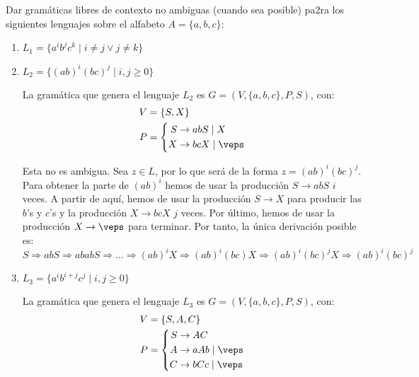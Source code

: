 \begin{ejercicio}\label{ej:1.4.7}
    Dar gramáticas libres de contexto no ambiguas (cuando sea posible) pa2ra los siguientes lenguajes sobre el alfabeto $A = \{ a, b, c \}$:
    \begin{enumerate}
        \item $L_1 = \{ a^i b^j c^k \mid i \neq j \lor j \neq k \}$

        \item $L_2 = \{ (ab)^i (bc)^j \mid i, j \geq 0 \}$
        
        La gramática que genera el lenguaje $L_2$ es $G=(V,\{a,b,c\},P,S)$, con:
        \begin{equation*}
            \begin{aligned}
                V &= \{ S, X \} \\
                P &= \left\{
                    \begin{aligned}
                        S &\rightarrow abS \mid X \\
                        X &\rightarrow bcX \mid \veps
                    \end{aligned}
                \right.
            \end{aligned}
        \end{equation*}

        Esta no es ambigua. Sea $z\in L$, por lo que será de la forma $z=(ab)^i(bc)^j$. Para obtener la parte de $(ab)^i$ hemos de usar la producción $S\rightarrow abS$ $i$ veces. A partir de aquí, hemos de usar la producción $S\rightarrow X$ para producir las $b$'s y $c$'s y la producción $X\rightarrow bcX$ $j$ veces. Por último, hemos de usar la producción $X\rightarrow \veps$ para terminar. Por tanto, la única derivación posible es:
        \begin{equation*}
            S\Rightarrow abS\Rightarrow ababS\Rightarrow \ldots \Rightarrow (ab)^iX\Rightarrow (ab)^i(bc)X \Rightarrow (ab)^i(bc)^jX \Rightarrow (ab)^i(bc)^j
        \end{equation*}
        \item $L_3 = \{ a^i b^{i+j} c^j \mid i, j \geq 0 \}$
        
        La gramática que genera el lenguaje $L_3$ es $G=(V,\{a,b,c\},P,S)$, con:
        \begin{equation*}
            \begin{aligned}
                V &= \{ S, A, C \} \\
                P &= \left\{
                    \begin{aligned}
                        S &\rightarrow AC \\
                        A &\rightarrow aAb \mid \veps \\
                        C &\rightarrow bCc \mid \veps
                    \end{aligned}
                \right.
            \end{aligned}
        \end{equation*}


\end{enumerate}
\end{ejercicio}
